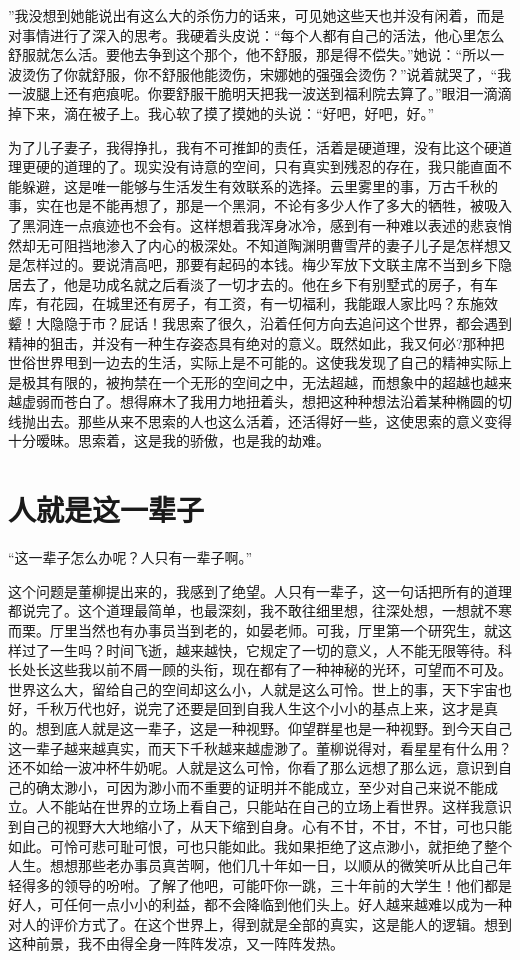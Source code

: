 \documentclass[12pt,oneside]{book}
\begin{document}
''我没想到她能说出有这么大的杀伤力的话来，可见她这些天也并没有闲着，而是对事情进行了深入的思考。我硬着头皮说：``每个人都有自己的活法，他心里怎么舒服就怎么活。要他去争到这个那个，他不舒服，那是得不偿失。''她说：``所以一波烫伤了你就舒服，你不舒服他能烫伤，宋娜她的强强会烫伤？''说着就哭了，``我一波腿上还有疤痕呢。你要舒服干脆明天把我一波送到福利院去算了。''眼泪一滴滴掉下来，滴在被子上。我心软了摸了摸她的头说：``好吧，好吧，好。''

为了儿子妻子，我得挣扎，我有不可推卸的责任，活着是硬道理，没有比这个硬道理更硬的道理的了。现实没有诗意的空间，只有真实到残忍的存在，我只能直面不能躲避，这是唯一能够与生活发生有效联系的选择。云里雾里的事，万古千秋的事，实在也是不能再想了，那是一个黑洞，不论有多少人作了多大的牺牲，被吸入了黑洞连一点痕迹也不会有。这样想着我浑身冰冷，感到有一种难以表述的悲哀悄然却无可阻挡地渗入了内心的极深处。不知道陶渊明曹雪芹的妻子儿子是怎样想又是怎样过的。要说清高吧，那要有起码的本钱。梅少军放下文联主席不当到乡下隐居去了，他是功成名就之后看淡了一切才去的。他在乡下有别墅式的房子，有车库，有花园，在城里还有房子，有工资，有一切福利，我能跟人家比吗？东施效颦！大隐隐于市？屁话！我思索了很久，沿着任何方向去追问这个世界，都会遇到精神的狙击，并没有一种生存姿态具有绝对的意义。既然如此，我又何必?那种把世俗世界甩到一边去的生活，实际上是不可能的。这使我发现了自己的精神实际上是极其有限的，被拘禁在一个无形的空间之中，无法超越，而想象中的超越也越来越虚弱而苍白了。想得麻木了我用力地扭着头，想把这种种想法沿着某种椭圆的切线抛出去。那些从来不思索的人也这么活着，还活得好一些，这使思索的意义变得十分暧昧。思索着，这是我的骄傲，也是我的劫难。


\chapter{人就是这一辈子}
``这一辈子怎么办呢？人只有一辈子啊。''

这个问题是董柳提出来的，我感到了绝望。人只有一辈子，这一句话把所有的道理都说完了。这个道理最简单，也最深刻，我不敢往细里想，往深处想，一想就不寒而栗。厅里当然也有办事员当到老的，如晏老师。可我，厅里第一个研究生，就这样过了一生吗？时间飞逝，越来越快，它规定了一切的意义，人不能无限等待。科长处长这些我以前不屑一顾的头衔，现在都有了一种神秘的光环，可望而不可及。世界这么大，留给自己的空间却这么小，人就是这么可怜。世上的事，天下宇宙也好，千秋万代也好，说完了还要是回到自我人生这个小小的基点上来，这才是真的。想到底人就是这一辈子，这是一种视野。仰望群星也是一种视野。到今天自己这一辈子越来越真实，而天下千秋越来越虚渺了。董柳说得对，看星星有什么用？还不如给一波冲杯牛奶呢。人就是这么可怜，你看了那么远想了那么远，意识到自己的确太渺小，可因为渺小而不重要的证明并不能成立，至少对自己来说不能成立。人不能站在世界的立场上看自己，只能站在自己的立场上看世界。这样我意识到自己的视野大大地缩小了，从天下缩到自身。心有不甘，不甘，不甘，可也只能如此。可怜可悲可耻可恨，可也只能如此。我如果拒绝了这点渺小，就拒绝了整个人生。想想那些老办事员真苦啊，他们几十年如一日，以顺从的微笑听从比自己年轻得多的领导的吩咐。了解了他吧，可能吓你一跳，三十年前的大学生！他们都是好人，可任何一点小小的利益，都不会降临到他们头上。好人越来越难以成为一种对人的评价方式了。在这个世界上，得到就是全部的真实，这是能人的逻辑。想到这种前景，我不由得全身一阵阵发凉，又一阵阵发热。
\end{document}

